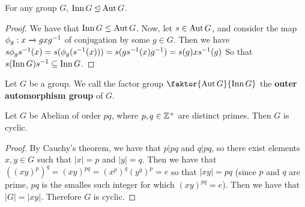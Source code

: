 \begin{lemma}\label{lemma_4.4.7}
  For any group $G$,  $\operatorname{Inn}{G} \unlhd \operatorname{Aut}{G}$.
\end{lemma}
\begin{proof}
  We have that $\operatorname{Inn}{G} \leq \operatorname{Aut}{G}$. Now, let $s \in \operatorname{Aut}{G}$, and consider
  the map $\phi_g:x \xrightarrow{} gxg^{-1}$ of conjugation by some $g \in G$.
  Then we have $s\phi_gs^{-1}(x)=s(\phi_g(s^{-1}(x)))=s(gs^{-1}(x)g^{-1})=
  s(g)xs^{-1}(g)$ So that $s(\operatorname{Inn}{G})s^{-1} \subseteq \operatorname{Inn}{G}$.
\end{proof}

\begin{definition}
  Let $G$ be a group. We call the factor group  $\faktor{\Aut{G}}{\Inn{G}}$
  the \textbf{outer automorphism group} of $G$.
\end{definition}

\begin{lemma}\label{lemma_4.4.8}
  Let $G$ be Abelian of order $pq$, where $p,q \in \mathbb{Z}^+$ are distinct primes.
  Then $G$ is cyclic.
\end{lemma}
\begin{proof}
  By Cauchy's theorem, we have that $p|pq$ and  $q|pq$, so there exist
  elements  $x,y \in G$ such that  $|x|=p$ and $|y|=q$. Then we have
  that $((xy)^p)^q=(xy)^{pq}=(x^p)^q(y^q)^p=e$ so that $|xy|=pq$ (since
  $p$ and $q$ are prime, $pq$ is the smalles such integer for which
  $(xy)^{pq}=e$). Then we have that $|G|=|xy|$. Therefore $G$ is
  cyclic.
\end{proof}
